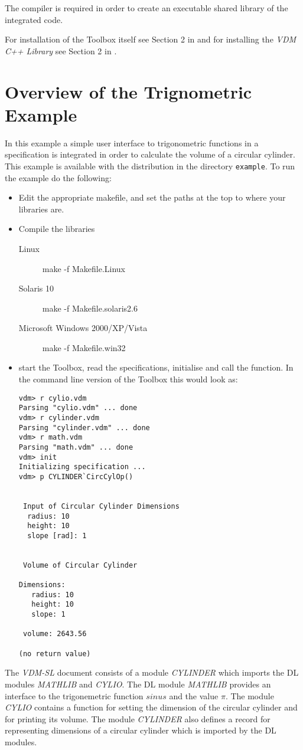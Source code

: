 \documentclass[\pformat,12pt]{article}
\begin{document}
The compiler is required in order to create an executable shared
library of the integrated code. 
 
For installation of the Toolbox itself see Section 2 in \cite{UserMan-SCSK}
and for installing the {\it VDM C++ Library} see Section 2 in \cite{CGMan-SCSK}.



\section{Overview of the Trignometric Example}
\label{example}
In this example a simple user interface to trigonometric functions in
a specification is integrated in order to calculate the volume of a
circular cylinder. This example is available with the distribution in
the directory {\tt example}. To run the example do the following:
\begin{itemize}
  \item Edit the appropriate makefile, and set the paths at the top
    to where your libraries are.
  \item Compile the libraries
  \begin{description}
    \item[Linux] make -f Makefile.Linux
    \item[Solaris 10] make -f Makefile.solaris2.6
    \item[Microsoft Windows 2000/XP/Vista] make -f Makefile.win32
  \end{description}
  \item start the Toolbox, read the specifications, initialise and
    call the function. In the command line version of the Toolbox this
    would look as:
\begin{verbatim}
vdm> r cylio.vdm
Parsing "cylio.vdm" ... done
vdm> r cylinder.vdm
Parsing "cylinder.vdm" ... done
vdm> r math.vdm
Parsing "math.vdm" ... done
vdm> init
Initializing specification ...
vdm> p CYLINDER`CircCylOp()


 Input of Circular Cylinder Dimensions
  radius: 10
  height: 10
  slope [rad]: 1


 Volume of Circular Cylinder

Dimensions: 
   radius: 10
   height: 10
   slope: 1

 volume: 2643.56

(no return value)
\end{verbatim}
\end{itemize}

The {\it VDM-SL} document consists of a module {\sl CYLINDER} which
imports the DL modules {\sl MATHLIB} and {\sl CYLIO}. The DL module {\sl
  MATHLIB} provides an interface to the trigonemetric function $sinus$
and the value $\pi$. The module {\sl CYLIO} contains a function for
setting the dimension of the circular cylinder and for printing its
volume.  The module {\sl CYLINDER} also defines a record for
representing dimensions of a circular cylinder which is imported by
the DL modules.
\end{document}
